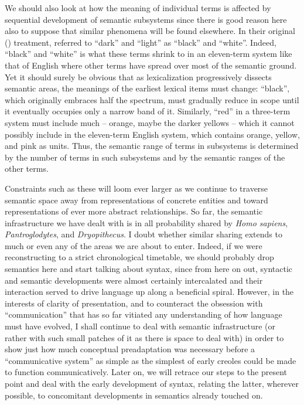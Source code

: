 We should also look at how the meaning of individual terms is affected by sequential development of semantic subsystems since there is good reason here also to suppose that similar phenomena will be found elsewhere. In their original (\citeyear{Berlin1969}) treatment, \citeauthor{Berlin1969} referred to ``dark'' and ``light'' as ``black'' and ``white''. Indeed, ``black'' and ``white'' is what these terms shrink to in an eleven-term system like that of English where other terms have spread over most of the semantic ground. Yet it should surely be obvious that as lexicalization progressively dissects semantic areas, the meanings of the earliest lexical items must change: ``black'', which originally embraces half the spectrum, must gradually reduce in scope until it eventually occupies only a narrow band of it. Similarly, ``red'' in a three-term system must include much -- orange, maybe the darker yellows -- which it cannot possibly include in the eleven-term English system, which contains orange, yellow, and pink as units. Thus, the semantic range of terms in subsystems is determined by the number of terms in such subsystems and by the semantic ranges of the other terms.

Constraints such as these will loom ever larger as we continue to traverse semantic space away from representations of concrete entities and toward representations of ever more abstract relationships. So far, the semantic infrastructure we have dealt with is in all probability shared by \textit{Homo sapiens}, \textit{Pantroglodytes}, and \textit{Dryopithecus}. I doubt whether similar sharing extends to much or even any of the areas we are about to enter. Indeed, if we were reconstructing to a strict chrono\-logical timetable, we should probably drop semantics here and start talking about syntax, since from here on out, syntactic and semantic developments were almost certainly intercalated and their interaction served to drive language up along a beneficial spiral. However, in the interests of clarity of presentation, and to counteract the obsession with ``communication'' that has so far vitiated any understanding
of how language must have evolved, I shall continue to deal with semantic infrastructure (or rather with such small patches of it as there is space to deal with) in order to show just how much conceptual preadaptation was necessary before a ``communicative system'' as simple as the simplest of early creoles could be made to function communicatively. Later on, we will retrace our steps to the present point and deal with the early development of syntax, relating the latter, wherever possible, to concomitant developments in semantics already touched on.\\\\

